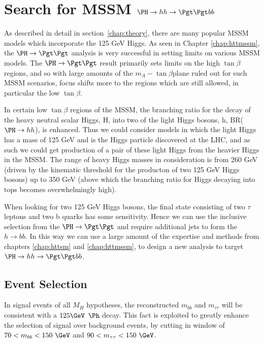 \chapter{Search for MSSM $\PH \to hh \to \Pgt\Pgt bb$}
\label{chap:Hhh}

As described in detail in section~\ref{chap:theory}, there are many popular MSSM
models which incorporate the 125 GeV Higgs. As seen in Chapter
\ref{chap:httmssm}, the $\PH \to \Pgt\Pgt$ analysis is very successful in 
setting limits on various MSSM models. The $\PH \to \Pgt \Pgt$ result primarily sets
limits on the high $\tan\beta$ regions, and so with large amounts of the
$m_{A}-\tan\beta$plane ruled out for such MSSM scenarios, focus shifts more 
to the regions which are still allowed, in particular the low $\tan\beta$.

In certain low $\tan\beta$ regions of the MSSM, the branching ratio for the
decay of the heavy neutral scalar Higgs, H, into two of the light Higgs bosons, h,
BR($\PH \to hh$), is enhanced. Thus we could consider models in which the
light Higgs has a mass of 125 GeV and is the Higgs particle discovered at the
LHC, and as such we could get production of a pair of these light Higgs from the
heavier Higgs in the MSSM. The range of heavy Higgs masses in consideration is from 260 GeV
(driven by the kinematic threshold for the producton of two 125 GeV Higgs
bosons) up to 350 GeV (above which the branching ratio for Higgs decaying into
tops becomes overwhelmingly high).

When looking for two 125 GeV Higgs bosons, the final state consisting of two
$\tau$ leptons and two b quarks has some sensitivity. Hence we can use the
inclusive selection from the $\PH \to \Pgt\Pgt$ and require additional jets
to form the $h \to bb$. In this way we can use a large amount of the
expertise and methods from chapters \ref{chap:httsm} and \ref{chap:httmssm}, 
to design a new analysis to target $\PH \to hh \to \Pgt\Pgt bb$.

\section{Event Selection}

In signal events of all $M_{H}$ hypotheses, the reconstructed $m_{bb}$ and
$m_{\tau\tau}$ will be consistent with a $125 \GeV$ $\Ph$ decay. This fact is exploited to greatly
enhance the selection of signal over background events, by cutting in window of
$70 < m_{bb} < 150~\GeV$ and $90 < m_{\tau\tau} < 150~\GeV$. 

